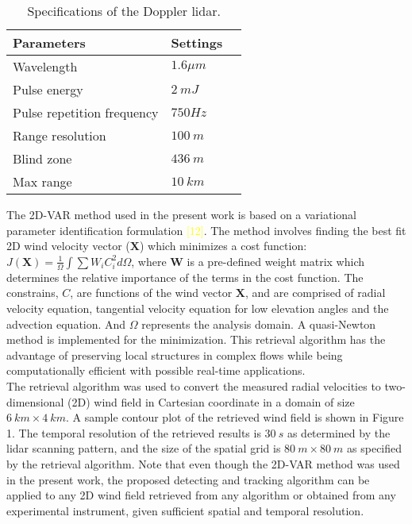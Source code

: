 \begin{table}
\caption{{Specifications of the Doppler lidar.}}
\centering
\label{table:lidarspec}
\begin{tabular}{|l|l|l|}
\hline
Parameters    & Settings \\ \hline
Wavelength & $1.6 \mu m$              \\ \hline
Pulse energy & $2~mJ$      \\ \hline
Pulse repetition frequency & $750\mathit{Hz}$     \\ \hline
Range resolution & $100~m$        \\ \hline
Blind zone & $436~m$          \\ \hline
Max range &	$10~km$ \\ \hline
\end{tabular}%
\end{table}

The 2D-VAR method used in the present work is based on a variational parameter identification formulation \textcolor{yellow}{[12]}. The method involves finding the best fit 2D wind velocity vector ($\boldsymbol{X}$) which minimizes a cost function: $J(\boldsymbol{X})=\frac{1}{\Omega}\int\sum W_i C_i^2d\Omega$, where $\boldsymbol{W}$ is a pre-defined weight matrix which determines the relative importance of the terms in the cost function. The constrains, $C$, are functions of the wind vector $\boldsymbol{X}$, and are comprised of radial velocity equation, tangential velocity equation for low elevation angles and the advection equation. And $\Omega$ represents the analysis domain. A quasi-Newton method is implemented for the minimization. This retrieval algorithm has the advantage of preserving local structures in complex flows while being computationally efficient with possible real-time applications.\\
The retrieval algorithm was used to convert the measured radial velocities to two-dimensional (2D) wind field in Cartesian coordinate in a domain of size $6~km \times 4~km$. A sample contour plot of the retrieved wind field is shown in Figure 1. The temporal resolution of the retrieved results is $30~s$ as determined by the lidar scanning pattern, and the size of the spatial grid is $80~m\times80~ m$ as specified by the retrieval algorithm. Note that even though the 2D-VAR method was used in the present work, the proposed detecting and tracking algorithm can be applied to any 2D wind field retrieved from any algorithm or obtained from any experimental instrument, given sufficient spatial and temporal resolution.
